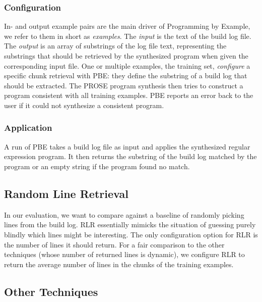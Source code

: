 \subsubsection{Configuration}
In- and output example pairs are the main driver of Programming by Example, we refer to them in short
as \emph{examples}.
The \emph{input} is the text of the build log file.
The \emph{output} is an array of substrings of the log file text, representing the substrings that should be retrieved by the synthesized program when given the corresponding input file.
One or multiple examples, the training set, \emph{configure} a specific chunk retrieval with PBE:
they define the substring of a build log that should be extracted.
The PROSE program synthesis then tries to construct a program consistent with all training examples.
PBE reports an error back to the user if it could not synthesize a consistent program.


\subsubsection{Application}
A run of PBE takes a build log file as input and applies the synthesized regular expression program.
It then returns the substring of the build log matched by the program or an empty string if the program found no match.


\subsection{Random Line Retrieval}
\label{sec:r:rlr}

In our evaluation, we want to compare against a baseline of randomly picking lines from the build log. RLR essentially mimicks the situation of guessing purely blindly which lines might be interesting.
The only configuration option for RLR is the number of lines it should return. For a fair comparison to the other techniques (whose number of returned lines is dynamic), we configure RLR to return the average number of lines in the chunks of the training examples. 

\subsection{Other Techniques}
\label{sec:expl-rlr}

